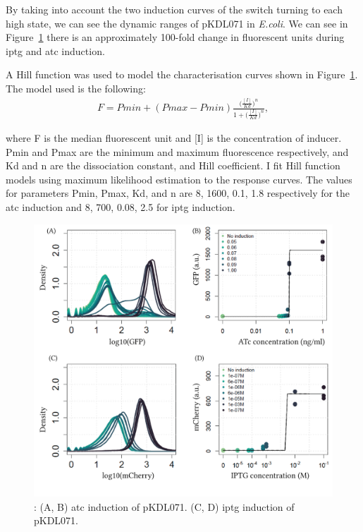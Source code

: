By taking into account the two induction curves of the switch turning to each high state, we can see the dynamic ranges of pKDL071 in \textit{E.coli}. We can see in Figure~\ref{fig:switch_concentrations_model} there is an approximately 100-fold change in fluorescent units during \acrshort{iptg} and \acrshort{atc} induction. 

 A Hill function was used to model the characterisation curves shown in Figure~\ref{fig:switch_concentrations_model}. The model used is the following:
 \begin{align}
 	F = Pmin + (Pmax - Pmin)\frac{\Big(\frac{[I]}{Kd}\Big)^n}{1+\Big(\frac{[I]}{Kd}\Big)^n},
 \end{align}
 
where F is the median fluorescent unit and [I] is the concentration of inducer. Pmin and Pmax are the minimum and maximum fluorescence respectively, and Kd and n are the dissociation constant, and Hill coefficient. I fit Hill function models using maximum likelihood estimation to the response curves. The values for parameters Pmin, Pmax, Kd, and n are 8, 1600, 0.1, 1.8 respectively for the \acrshort{atc} induction and 8, 700, 0.08, 2.5 for \acrshort{iptg} induction. 

\begin{figure}[tb]
	\begin{center}
\includegraphics[width=\textwidth]{chapterCharacterisation/images/pKDL071_concentrations_model_fit.png}
\caption[LoF caption]{\label{fig:switch_concentrations_model}: (A, B) \acrshort{atc} induction of pKDL071. (C, D) \acrshort{iptg} induction of pKDL071.}
\end{center}
\end{figure}


